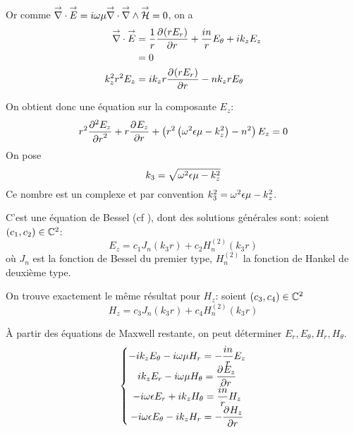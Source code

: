 
Or comme $\vdiv \vE = i\w\mu\vdiv\vrot\vH = 0$, on a
\begin{align}
    \vdiv\vE &= \frac{1}{r}\ddr{r}{(rE_r)} + \frac{in}{r}E_\theta + ik_zE_z
    \\
    &=0
    \\
    k_z^2r^2 E_z &= ik_zr\ddr{r}{(rE_r)} - nk_zrE_\theta
\end{align}

On obtient donc une équation sur la composante $E_z$:
\begin{equation}
    r^2 \ddr[2]{r}{E_z} + r\ddr{r}{E_z} + \left(r^2\left(\w^2\eps\mu - k_z^2\right) - n^2\right)E_z = 0
\end{equation}
On pose 
\begin{equation}
    k_3 = \sqrt{\w^2\eps\mu - k_z^2}
\end{equation}
Ce nombre est un complexe et par convention $k_3^2 = \w^2\eps\mu - k_z^2$.

C'est une équation de Bessel (cf \cite[eq (6.80)]{bowman_introduction_1958}), dont des solutions générales sont: soient $(c_1,c_2) \in \CC^2$:
\begin{equation}
    E_z = c_1 J_n\left(k_3r\right) + c_2 H_n^{(2)}\left(k_3r\right)
\end{equation}
où $J_n$ est la fonction de Bessel du premier type, $H_n^{(2)}$ la fonction de Hankel de deuxième type. 

On trouve exactement le même résultat pour $H_z$: soient $(c_3,c_4) \in \CC^2$
\begin{equation}
    H_z = c_3 J_n\left(k_3r\right) + c_4 H_n^{(2)}\left(k_3r\right)
\end{equation}

À partir des équations de Maxwell restante, on peut déterminer $E_r,E_\theta,H_r,H_\theta$.
\begin{equation}
    \left\lbrace
    \begin{matrix}
        -ik_zE_\theta - i\w\mu H_r = -\frac{in}{r}E_z
        \\
        ik_zE_r - i\w\mu H_\theta = \ddr{r}{E_z}
        \\
        -i\w\eps E_r + ik_z H_\theta = \frac{in}{r}H_z
        \\
        -i\w\eps E_\theta - ik_z H_r = -\ddr{r}{H_z}
    \end{matrix}
    \right.
\end{equation}

